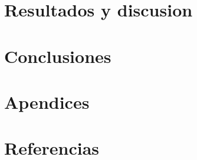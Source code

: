 \documentclass[10pt,a4paper]{article}
\begin{document}
% 

\section{Resultados y discusion}

\newpage


% 

\section{Conclusiones}

\newpage

\section{Apendices}
	
\newpage

\section{Referencias}
	
\newpage
\end{document}
